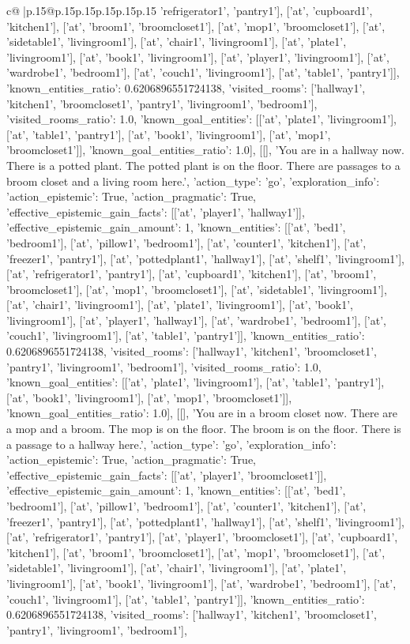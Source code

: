 \documentclass{article}
\begin{document}
{\begin{supertabular}{c@{$\;$}|p{.15\linewidth}@{}p{.15\linewidth}p{.15\linewidth}p{.15\linewidth}p{.15\linewidth}p{.15\linewidth}}
{{{'refrigerator1', 'pantry1'], ['at', 'cupboard1', 'kitchen1'], ['at', 'broom1', 'broomcloset1'], ['at', 'mop1', 'broomcloset1'], ['at', 'sidetable1', 'livingroom1'], ['at', 'chair1', 'livingroom1'], ['at', 'plate1', 'livingroom1'], ['at', 'book1', 'livingroom1'], ['at', 'player1', 'livingroom1'], ['at', 'wardrobe1', 'bedroom1'], ['at', 'couch1', 'livingroom1'], ['at', 'table1', 'pantry1']], 'known_entities_ratio': 0.6206896551724138, 'visited_rooms': ['hallway1', 'kitchen1', 'broomcloset1', 'pantry1', 'livingroom1', 'bedroom1'], 'visited_rooms_ratio': 1.0, 'known_goal_entities': [['at', 'plate1', 'livingroom1'], ['at', 'table1', 'pantry1'], ['at', 'book1', 'livingroom1'], ['at', 'mop1', 'broomcloset1']], 'known_goal_entities_ratio': 1.0}}], [[], 'You are in a hallway now. There is a potted plant. The potted plant is on the floor. There are passages to a broom closet and a living room here.', {'action_type': 'go', 'exploration_info': {'action_epistemic': True, 'action_pragmatic': True, 'effective_epistemic_gain_facts': [['at', 'player1', 'hallway1']], 'effective_epistemic_gain_amount': 1, 'known_entities': [['at', 'bed1', 'bedroom1'], ['at', 'pillow1', 'bedroom1'], ['at', 'counter1', 'kitchen1'], ['at', 'freezer1', 'pantry1'], ['at', 'pottedplant1', 'hallway1'], ['at', 'shelf1', 'livingroom1'], ['at', 'refrigerator1', 'pantry1'], ['at', 'cupboard1', 'kitchen1'], ['at', 'broom1', 'broomcloset1'], ['at', 'mop1', 'broomcloset1'], ['at', 'sidetable1', 'livingroom1'], ['at', 'chair1', 'livingroom1'], ['at', 'plate1', 'livingroom1'], ['at', 'book1', 'livingroom1'], ['at', 'player1', 'hallway1'], ['at', 'wardrobe1', 'bedroom1'], ['at', 'couch1', 'livingroom1'], ['at', 'table1', 'pantry1']], 'known_entities_ratio': 0.6206896551724138, 'visited_rooms': ['hallway1', 'kitchen1', 'broomcloset1', 'pantry1', 'livingroom1', 'bedroom1'], 'visited_rooms_ratio': 1.0, 'known_goal_entities': [['at', 'plate1', 'livingroom1'], ['at', 'table1', 'pantry1'], ['at', 'book1', 'livingroom1'], ['at', 'mop1', 'broomcloset1']], 'known_goal_entities_ratio': 1.0}}], [[], 'You are in a broom closet now. There are a mop and a broom. The mop is on the floor. The broom is on the floor. There is a passage to a hallway here.', {'action_type': 'go', 'exploration_info': {'action_epistemic': True, 'action_pragmatic': True, 'effective_epistemic_gain_facts': [['at', 'player1', 'broomcloset1']], 'effective_epistemic_gain_amount': 1, 'known_entities': [['at', 'bed1', 'bedroom1'], ['at', 'pillow1', 'bedroom1'], ['at', 'counter1', 'kitchen1'], ['at', 'freezer1', 'pantry1'], ['at', 'pottedplant1', 'hallway1'], ['at', 'shelf1', 'livingroom1'], ['at', 'refrigerator1', 'pantry1'], ['at', 'player1', 'broomcloset1'], ['at', 'cupboard1', 'kitchen1'], ['at', 'broom1', 'broomcloset1'], ['at', 'mop1', 'broomcloset1'], ['at', 'sidetable1', 'livingroom1'], ['at', 'chair1', 'livingroom1'], ['at', 'plate1', 'livingroom1'], ['at', 'book1', 'livingroom1'], ['at', 'wardrobe1', 'bedroom1'], ['at', 'couch1', 'livingroom1'], ['at', 'table1', 'pantry1']], 'known_entities_ratio': 0.6206896551724138, 'visited_rooms': ['hallway1', 'kitchen1', 'broomcloset1', 'pantry1', 'livingroom1', 'bedroom1'], }}}
\end{supertabular}}
\end{document}
